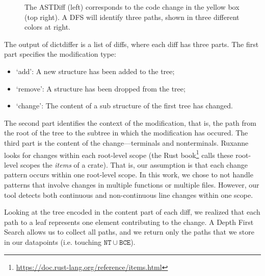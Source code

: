 \begin{figure}[h]
    
    \caption{\label{fig:extraction}The ASTDiff (left) corresponds to the code change in the yellow box (top right). A DFS will identify three paths, shown in three different colors at right.}

\end{figure}


The output of dictdiffer is a list of diffs, where each diff has three parts. The first part specifies the modification type:

\begin{itemize}
    \item `add': A new structure has been added to the tree; 
    \item `remove': A structure has been dropped from the tree; 
    \item `change': The content of a sub structure of the first tree has changed.
\end{itemize}

The second part identifies the context of the modification, that is, the path from the root of the tree to the subtree in which the modification has occured. The third part is the content of the change---terminals and nonterminals. Ruxanne looks for changes within each root-level scope (the Rust book\footnote{\url{https://doc.rust-lang.org/reference/items.html}} calls these root-level scopes the \textit{items} of a crate). That is, our assumption is that each change pattern occurs within one root-level scope. In this work, we chose to not handle patterns that involve changes in multiple functions or multiple files. However, our tool detects both continuous and non-continuous line changes within one scope.

Looking at the tree encoded in the content part of each diff, we realized that each path to a leaf represents one element contributing to the change. A Depth First Search allows us to collect all paths, and we return only the paths that we store in our datapoints (i.e. touching $\mathtt{NT} \cup \mathtt{BCE}$).

